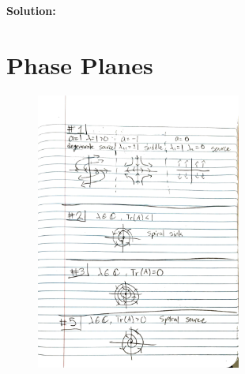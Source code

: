 \documentclass[12pt]{article}
\newenvironment{solution}{
    \textbf{Solution:}
    
}{
    
    \vspace{2em}
}
\begin{document}
\begin{solution}
\newpage

\section{Phase Planes}

\begin{figure}[H]
    \centering
    \includegraphics[width=0.6\textwidth]{123.pdf}
\end{figure}
    
    
    

\end{solution}
\end{document}
